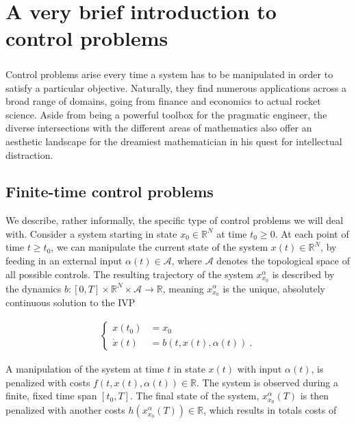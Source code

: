\chapter{A very brief introduction to control problems} 

	\paragraph{}
	Control problems arise every time a system has to be manipulated in order to satisfy a particular objective. Naturally, they find numerous applications across a broad range of domains, going from finance and economics to actual rocket science. Aside from being a powerful toolbox for the pragmatic engineer, the diverse intersections with the different areas of mathematics also offer an aesthetic landscape for the dreamiest mathematician in his quest for intellectual distraction. 
	
	\section{Finite-time control problems}
	
	We describe, rather informally, the specific type of control problems we will deal with. Consider a system starting in state $ x_0 \in \mathbb{R}^N $ at time $ t_0 \geq 0 $. At each point of time $ t \geq t_0 $, we can manipulate the current state of the system $ x(t) \in \mathbb{R}^N $, by feeding in an external input $ \alpha(t) \in \mathcal{A} $, where $ \mathcal{A} $ denotes the topological space of all possible controls. The resulting trajectory of the system $ x^{\alpha}_{x_0} $ is described by the dynamics $ b : \left[ 0 , T \right] \times \mathbb{R}^N \times \mathcal{A} \to \mathbb{R} $, meaning $ x^{\alpha}_{x_0} $ is the unique, absolutely continuous solution to the IVP
	
	\begin{align*}
	\begin{cases}
	x(t_0) &= x_0 \\
	\dot{x}(t) &= b(t, x(t), \alpha(t)) \ .
	\end{cases}
	\end{align*}
	
	A manipulation of the system at time $ t $ in state $ x(t) $ with input $ \alpha(t) $, is penalized with costs $ f(t, x(t), \alpha(t)) \in \mathbb{R} $. The system is observed during a finite, fixed time span $ \left[t_0, T \right] $. The final state of the system, $ x^{\alpha}_{x_0}(T) $ is then penalized with another costs $ h(x^{\alpha}_{x_0}(T)) \in \mathbb{R} $, which results in totals costs of
	
